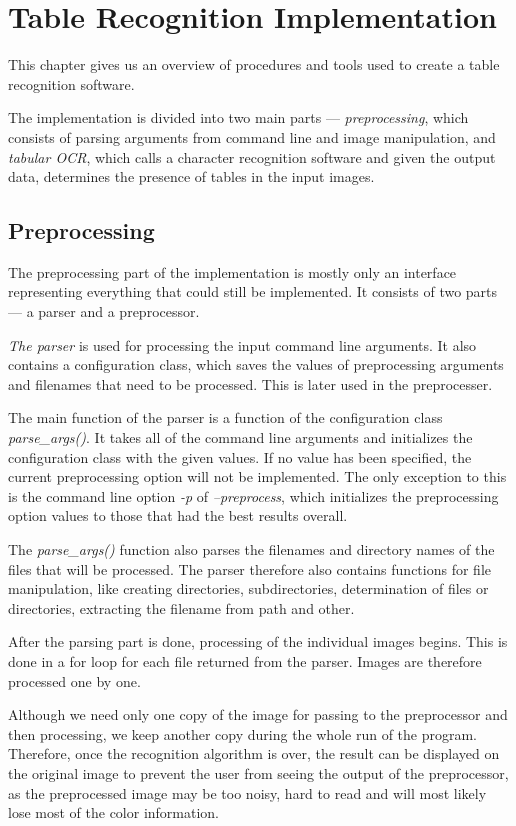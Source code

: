 \chapter{Table Recognition Implementation}

This chapter gives us an overview of procedures and tools used to create a table recognition software. 

The implementation is divided into two main parts --- \emph{preprocessing}, which consists of parsing arguments from command line and image manipulation, and \emph{tabular OCR}, which calls a character recognition software and given the output data, determines the presence of tables in the input images.

\section{Preprocessing}

The preprocessing part of the implementation is mostly only an interface representing everything that could still be implemented. It consists of two parts --- a parser and a preprocessor.

\emph{The parser} is used for processing the input command line arguments. It also contains a configuration class, which saves the values of preprocessing arguments and filenames that need to be processed. This is later used in the preprocesser. 

The main function of the parser is a function of the configuration class \emph{parse\_args()}. It takes all of the command line arguments and initializes the configuration class with the given values. If no value has been specified, the current preprocessing option will not be implemented. The only exception to this is the command line option \emph{-p} of \emph{--preprocess}, which initializes the preprocessing option values to those that had the best results overall.

The \emph{parse\_args()} function also parses the filenames and directory names of the files that will be processed. The parser therefore also contains functions for file manipulation, like creating directories, subdirectories, determination of files or directories, extracting the filename from path and other. 

After the parsing part is done, processing of the individual images begins. This is done in a for loop for each file returned from the parser. Images are therefore processed one by one.

Although we need only one copy of the image for passing to the preprocessor and then processing, we keep another copy during the whole run of the program. Therefore, once the recognition algorithm is over, the result can be displayed on the original image to prevent the user from seeing the output of the preprocessor, as the preprocessed image may be too noisy, hard to read and will most likely lose most of the color information.

